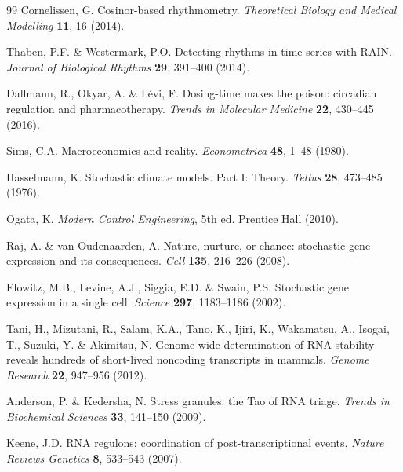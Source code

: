 \documentclass[11pt,letterpaper]{article}
\begin{document}
\begin{thebibliography}{99}
Cornelissen, G.
Cosinor-based rhythmometry.
\textit{Theoretical Biology and Medical Modelling} \textbf{11}, 16 (2014).

Thaben, P.F. \& Westermark, P.O.
Detecting rhythms in time series with RAIN.
\textit{Journal of Biological Rhythms} \textbf{29}, 391--400 (2014).

Dallmann, R., Okyar, A. \& L{\'e}vi, F.
Dosing-time makes the poison: circadian regulation and pharmacotherapy.
\textit{Trends in Molecular Medicine} \textbf{22}, 430--445 (2016).

Sims, C.A.
Macroeconomics and reality.
\textit{Econometrica} \textbf{48}, 1--48 (1980).

Hasselmann, K.
Stochastic climate models. Part I: Theory.
\textit{Tellus} \textbf{28}, 473--485 (1976).

Ogata, K.
\textit{Modern Control Engineering}, 5th ed.
Prentice Hall (2010).

Raj, A. \& van Oudenaarden, A.
Nature, nurture, or chance: stochastic gene expression and its consequences.
\textit{Cell} \textbf{135}, 216--226 (2008).

Elowitz, M.B., Levine, A.J., Siggia, E.D. \& Swain, P.S.
Stochastic gene expression in a single cell.
\textit{Science} \textbf{297}, 1183--1186 (2002).

Tani, H., Mizutani, R., Salam, K.A., Tano, K., Ijiri, K., Wakamatsu, A., Isogai, T., Suzuki, Y. \& Akimitsu, N.
Genome-wide determination of RNA stability reveals hundreds of short-lived noncoding transcripts in mammals.
\textit{Genome Research} \textbf{22}, 947--956 (2012).

Anderson, P. \& Kedersha, N.
Stress granules: the Tao of RNA triage.
\textit{Trends in Biochemical Sciences} \textbf{33}, 141--150 (2009).

Keene, J.D.
RNA regulons: coordination of post-transcriptional events.
\textit{Nature Reviews Genetics} \textbf{8}, 533--543 (2007).

\end{thebibliography}
\end{document}
